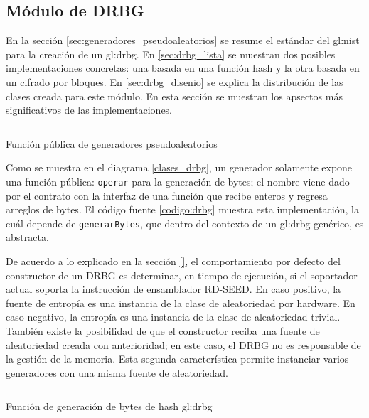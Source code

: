 %
%
%

\subsection{Módulo de DRBG}
\label{sec:implementacion_drbg}

En la sección \ref{sec:generadores_pseudoaleatorios} se resume el estándar del
\gls{gl:nist} para la  creación de un \gls{gl:drbg}. En \ref{sec:drbg_lista} se
muestran dos posibles implementaciones concretas: una basada en una función
hash y la  otra basada en un cifrado por bloques. En \ref{sec:drbg_disenio} se
explica la distribución de las clases creada para este módulo. En esta sección
se muestran los apsectos más significativos de las implementaciones.

\begin{listing}
  \inputminted[firstline=66, lastline=90]
    {c++}{../implementaciones/drbg/drbg.cpp}
  \caption{Función pública de generadores pseudoaleatorios}
  \label{codigo:drbg}
\end{listing}

Como se muestra en el diagrama \ref{clases_drbg}, un generador solamente
expone una función pública: \texttt{operar} para la generación de bytes; el
nombre viene dado por el contrato con la interfaz de una función que
recibe enteros y regresa arreglos de bytes. El código fuente \ref{codigo:drbg}
muestra esta implementación, la cuál depende de \texttt{generarBytes}, que
dentro del contexto de un \gls{gl:drbg} genérico, es abstracta.

De acuerdo a lo explicado en la sección \ref{}, el comportamiento por defecto del constructor de un DRBG es determinar, en tiempo de ejecución, si el soportador actual soporta la instrucción de ensamblador RD-SEED. En caso positivo, la fuente de entropía es una instancia de la clase de aleatoriedad por hardware. En caso negativo, la entropía es una instancia de la clase de aleatoriedad trivial. También existe la posibilidad de que el constructor reciba una fuente de aleatoriedad creada con anterioridad; en este caso, el DRBG no es responsable de la gestión de la memoria. Esta segunda característica permite instanciar varios generadores con una misma fuente de aleatoriedad.

\begin{listing}
  \inputminted[firstline=117, lastline=135]
    {c++}{../implementaciones/drbg/hash_drbg.cpp}
  \caption{Función de generación de bytes de hash \gls{gl:drbg}}
  \label{codigo:hash_drbg_uno}
\end{listing}

